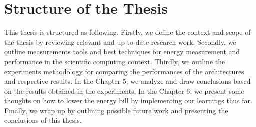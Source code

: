 \section{Structure of the Thesis}
This thesis is structured as following. Firstly, we define the context and scope
of the thesis by reviewing relevant and up to date research work. Secondly, we
outline measurements tools and best techniques for energy measurement and
performance in the scientific computing context. Thirdly, we outline the
experiments methodology for comparing the performances of the architectures and 
respective results. In the Chapter 5, we analyze and draw conclusions based on
the results obtained in the experiments. In the Chapter 6, we present some
thoughts on how to lower the energy bill by implementing our learnings thus
far. Finally, we wrap up by outlining possible future work and presenting the
conclusions of this thesis.
